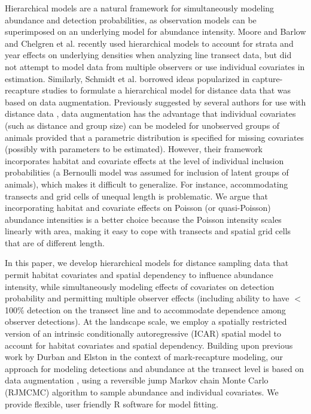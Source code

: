 \documentclass[10pt]{article}
\begin{document}
Hierarchical models are a natural framework for simultaneously modeling abundance and detection probabilities, as observation models can be superimposed on an underlying model for abundance intensity.  Moore and Barlow \cite{MooreBarlow2011} and Chelgren et al. \cite{ChelgrenEtAl2011} recently used hierarchical models to account for strata and year effects on underlying densities when analyzing line transect data, but did not attempt to model data from multiple observers or use individual covariates in estimation. Similarly, Schmidt et al. \cite{SchmidtEtAl2012} borrowed ideas popularized in capture-recapture studies \cite{RoyleEtAl2007b,RoyleDorazio2008,Royle2009} to formulate a hierarchical model for distance data that was based on data augmentation.  Previously suggested by several authors for use with distance data \cite{RoyleDorazio2008,LinkBarker2010}, data augmentation has the advantage that individual covariates (such as distance and group size) can be modeled for unobserved groups of animals provided that a parametric distribution is specified for missing covariates (possibly with parameters to be estimated).
However, their framework incorporates habitat and covariate effects at the level of individual inclusion probabilities (a Bernoulli model was assumed for inclusion of latent groups of animals), which makes it difficult to generalize.  For instance, accommodating transects and grid cells of unequal length is problematic. We argue that incorporating habitat and covariate effects on Poisson (or quasi-Poisson) abundance intensities is a better choice because the Poisson intensity scales linearly with area, making it easy to cope with transects and spatial grid cells that are of different length.

In this paper, we develop hierarchical models for distance sampling data that permit habitat covariates and spatial dependency to influence abundance intensity, while simultaneously modeling effects of covariates on detection probability and permitting multiple observer effects (including ability to have $<$100\% detection on the transect line and to accommodate dependence among observer detections).  At the landscape scale, we employ a spatially restricted version \cite{ReichEtAl2006,HughesHaran2012} of an intrinsic conditionally autoregressive (ICAR) spatial model \cite{BesagEtAl1991,BesagKooperberg1995,RueHeld2005} to account for habitat covariates and spatial dependency.  Building upon previous work by Durban and Elston \cite{DurbanElston2005} in the context of mark-recapture modeling, our approach for modeling detections and abundance at the transect level is based on data augmentation \cite{TannerWong1987,RoyleEtAl2007b}, using a reversible jump Markov chain Monte Carlo (RJMCMC) algorithm \cite{CarlinChib1995,Green1995} to sample abundance and individual covariates. We provide flexible, user friendly R software for model fitting.
\end{document}
